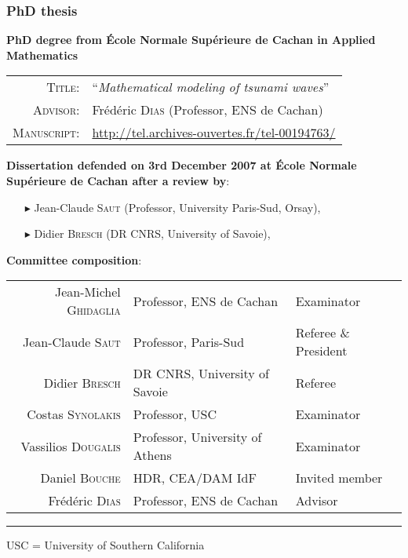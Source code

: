 \vspace*{3mm}\separator
\subsubsection{PhD thesis}

\textbf{PhD degree from \'{E}cole Normale Sup\'erieure de Cachan in Applied Mathematics}

\begin{tabular}{rl}
  \textsc{Title}: & ``\textit{Mathematical modeling of tsunami waves}'' \\
  \textsc{Advisor}: & Fr\'ed\'eric \textsc{Dias} (Professor, ENS de Cachan) \\
  \textsc{Manuscript:} & \url{http://tel.archives-ouvertes.fr/tel-00194763/}
\end{tabular}

\textbf{Dissertation defended on 3rd December 2007 at \'{E}cole Normale Sup\'erieure de Cachan after a review by}:

\vspace{0.5em}

\begin{itemize}
  \item[$\blacktriangleright$] Jean-Claude \textsc{Saut} (Professor, University Paris-Sud, Orsay),
  \item[$\blacktriangleright$] Didier \textsc{Bresch} (DR CNRS, University of Savoie),
\end{itemize}

\vspace{1em}

\textbf{Committee composition}:

\vspace{1em}

\begin{tabular}{rll}
  Jean-Michel \textsc{Ghidaglia} & Professor, ENS de Cachan & Examinator \\
  Jean-Claude \textsc{Saut} & Professor, Paris-Sud & Referee \& President \\
  Didier \textsc{Bresch} & DR CNRS, University of Savoie & Referee \\
  Costas \textsc{Synolakis} & Professor, USC & Examinator \\
  Vassilios \textsc{Dougalis} & Professor, University of Athens & Examinator \\
  Daniel \textsc{Bouche} & HDR, CEA/DAM IdF & Invited member \\
  Fr\'ed\'eric \textsc{Dias} & Professor, ENS de Cachan & Advisor
\end{tabular}
\vspace{7pt}
\hrule width 3cm
\vspace{7pt}
USC = University of Southern California

